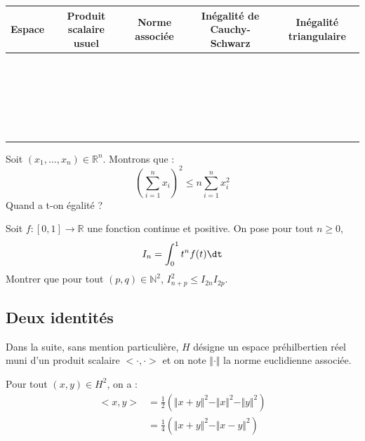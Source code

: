 \documentclass[a4paper,10pt]{report}
\begin{document}
\begin{tabular}{|c|c| c| c| c|}
\hline
Espace & Produit scalaire usuel & Norme associée & Inégalité de Cauchy-Schwarz & Inégalité triangulaire \\
\hline
& & & & \\
& & & & \\
& & & & \\
& & & & \\
& & & & \\
& & & & \\
\hline
& & & & \\
& & & & \\
& & & & \\
& & & & \\
& & & & \\
& & & & \\
\hline
& & & & \\
& & & & \\
& & & & \\
& & & & \\
& & & & \\
& & & & \\
\hline
& & & & \\
& & & & \\
& & & & \\
& & & & \\
& & & & \\
& & & & \\
\hline
\end{tabular}

\bigskip

\begin{ex} Soit $(x_1, \ldots, x_n) \in \mathbb{R}^n$. Montrons que :
$$ \left(\sum_{i=1}^n x_i \right)^2 \leq n \sum_{i=1}^n x_i^2$$
Quand a t-on égalité ?

\vspace{6cm}
\end{ex}

\begin{exa} Soit $f : [0,1] \rightarrow \mathbb{R}$ une fonction continue et positive. On pose pour tout $n \geq 0$,
$$ I_n = \int_{0}^1 t^n f(t) \dt$$
Montrer que pour tout $(p,q) \in \mathbb{N}^2$,  $I_{n+p}^2 \leq I_{2n} I_{2p}$.
\end{exa}

\subsection{Deux identités}
\noindent Dans la suite, sans mention particulière, $H$ désigne un espace préhilbertien réel muni d'un produit scalaire $< \cdot , \cdot>$ et on note $\Vert \cdot \Vert$ la norme euclidienne associée.
\begin{prop} Pour tout $(x,y) \in H^2$, on a :
\begin{align*}
<x,y> & = \frac{1}{2} ( \Vert x+ y \Vert^2 - \Vert x \Vert^2 - \Vert y \Vert^2 )  \\
& = \frac{1}{4} ( \Vert x+y \Vert^2 - \Vert x-y \Vert^2) 
\end{align*}
\end{prop}
\end{document}
